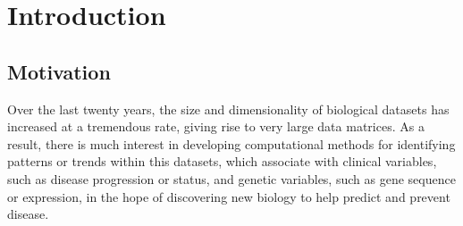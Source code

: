 %

\chapter[Introduction]{ \label{chapter:intro} Introduction}

\section{Motivation}

Over the last twenty years, the size and dimensionality of biological datasets has increased at a tremendous rate,
giving rise to very large data matrices.
As a result, there is much interest in developing computational methods for identifying patterns or trends 
within this datasets, which associate with clinical variables, such as disease progression or status,
and genetic variables, such as gene sequence or expression, in the hope of discovering new biology
to help predict and prevent disease.

